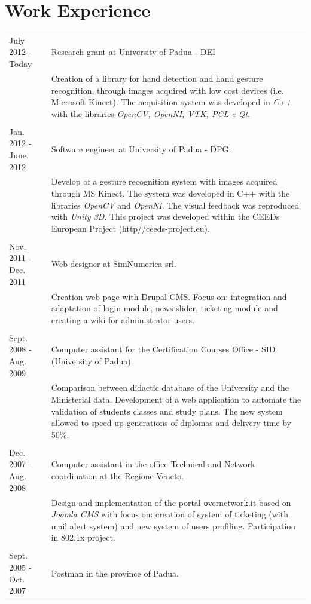 \documentclass[pdftex,a4paper,10pt,twoside,titlepage]{article}
\begin{document}
\section*{Work Experience}
\begin{tabular}[h]{l p{}}
\footnotesize{July 2012 - Today} & Research grant at University of Padua - DEI \\
 & Creation of a library for hand detection and hand gesture recognition, 
 through images acquired with low cost devices  (i.e. Microsoft Kinect). The acquisition system was
developed in \textit{C++} with the libraries \textit{OpenCV, OpenNI, VTK, PCL e Qt}.\\
 & \\
\footnotesize{Jan. 2012 - June. 2012} & Software engineer at University of Padua - DPG.\\
& Develop of a gesture recognition system with images acquired through MS Kinect. The system was
developed in C++ with the libraries \textit{OpenCV} and \textit{OpenNI}. The visual feedback was reproduced with \textit{Unity 3D}.
This project was developed within the CEEDs European Project (http//ceeds-project.eu).\\
&\\
\footnotesize{Nov. 2011 - Dec. 2011} & Web designer at SimNumerica srl.\\
& Creation web page with Drupal CMS. Focus on: integration and adaptation of login-module, news-slider, 
		ticketing module and creating a wiki for administrator users. \\
&\\
\footnotesize{Sept. 2008 - Aug. 2009} &  Computer assistant for the Certification Courses Office - SID (University of Padua)\\
& Comparison between didactic database of the University and the Ministerial data.
 Development of a web application to automate the validation of students classes and study plans. The new system allowed
 to speed-up generations of diplomas and delivery time by 50\%.\\
&\\
\footnotesize{Dec. 2007  -  Aug. 2008} & Computer assistant in the office Technical and Network coordination at the Regione Veneto.\\
 & Design and implementation of the portal {\texttt overnetwork.it} based on \textit{Joomla CMS}
  with focus on: creation of system of ticketing (with mail alert system) and new system of users profiling. Participation in 802.1x project.\\
&\\
\footnotesize{Sept. 2005 - Oct. 2007} & Postman in the province of Padua.
\end{tabular} 
\end{document}
